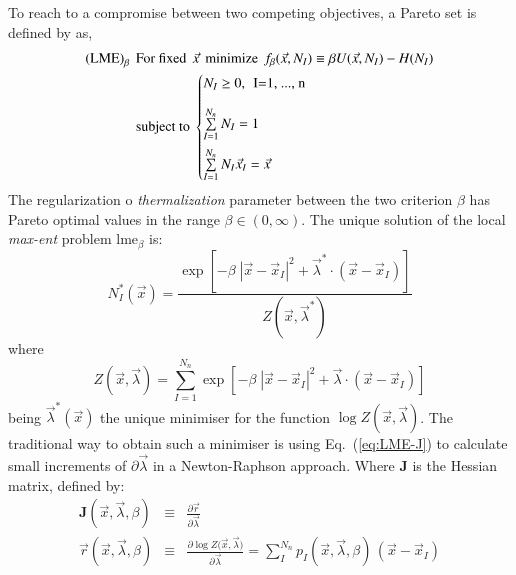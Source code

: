\documentclass[preprint,12pt,a4paper]{elsarticle}
\newcommand{\tens}[1]{
  \ensuremath{\mathbf{{#1}}}
}
\begin{document}
To reach to a compromise between two competing objectives, a Pareto set is defined by \cite{Arroyo2006} as,
\begin{align*}
  \label{eq:LME-scheme-pareto-set}
  \text{(LME)}_{\beta} \hspace{0.15cm} &\text{For fixed} \hspace{0.15cm}
  \vec{x} \hspace{0.15cm} \text{minimize} \hspace{0.15cm} f_{\beta}(\vec{x}, N_I) \equiv \beta U(\vec{x},N_I) - H(N_I) \\
  &\text{subject to}\
  \begin{cases}
    N_I \ge 0, \hspace{0.15cm} \text{I=1, ..., n} \\[1em]   
    \sum\limits_{I=1}^{N_n}{N_I} = 1 \\[1em]   
    \sum\limits_{I=1}^{N_n}{N_I \vec{x}_I} = \vec{x} \\
  \end{cases}
\end{align*}
The regularization o \textit{thermalization} parameter
between the two criterion $\beta$ has Pareto optimal values in the range
$\beta \in (0,\infty)$. The unique solution of
the local \textit{max-ent} problem \acrshort{lme}$_\beta$ is:
\begin{equation}
  \label{eq:LME-p}
N_I^*(\vec{x})=\frac{\exp\left[ -\beta \; |\vec{x}-\vec{x}_I|^2 +
    \vec{\lambda}^* \cdot (\vec{x}-\vec{x}_I) \right] } {Z(\vec{x},\vec{\lambda}^*)}
\end{equation}
where
\begin{equation}
  \label{eq:LME-Z}
Z(\vec{x}, {\vec{\lambda}}) = \sum_{I=1}^{N_n}{ \exp \left[ -\beta \; |\vec{x}-\vec{x}_I|^2 + \vec{\lambda} \cdot (\vec{x}-\vec{x}_I)  \right]}
\end{equation}
being $\vec{\lambda}^*(\vec{x})$ the unique minimiser for the function $\log
Z(\vec{x}, \vec{\lambda})$. The traditional way to obtain such a minimiser is using Eq.~(\ref{eq:LME-J}) to calculate small increments of $\partial\vec{\lambda}$ in a Newton-Raphson approach. Where $\tens{J}$ is the Hessian matrix, defined by:
\begin{eqnarray}
  \label{eq:LME-J} 
  \tens{J}(\vec{x}, \vec{\lambda},\beta) &\equiv& \frac{\partial
                                                  \vec{r}}{\partial \vec{\lambda}}\\
  \label{eq:LME-r}
  \vec{r}(\vec{x},\vec{\lambda},\beta) &\equiv& \frac{\partial \log{ Z(   \vec{x},\vec{\lambda}})}{\partial \vec{\lambda}}  = \sum_I^{N_n} p_I(\vec{x},\vec{\lambda},\beta) \, (\vec{x} - \vec{x}_I)
\end{eqnarray}
\end{document}
